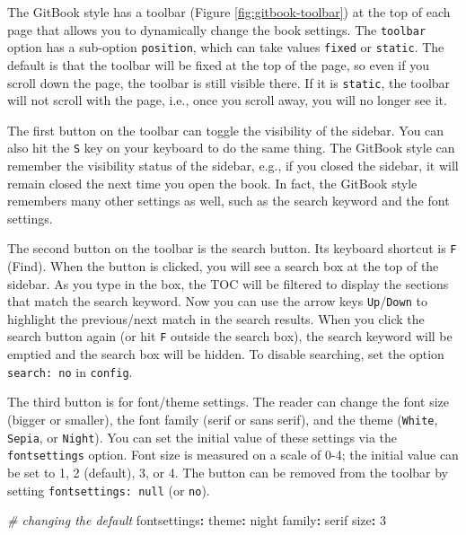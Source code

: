 \documentclass[
  12pt,
]{krantz}
\newenvironment{Shaded}{\begin{snugshade}}{\end{snugshade}}
\newcommand{\AttributeTok}[1]{\textcolor[rgb]{0.77,0.63,0.00}{#1}}
\newcommand{\CommentTok}[1]{\textcolor[rgb]{0.56,0.35,0.01}{\textit{#1}}}
\newcommand{\DecValTok}[1]{\textcolor[rgb]{0.00,0.00,0.81}{#1}}
\newcommand{\FunctionTok}[1]{\textcolor[rgb]{0.00,0.00,0.00}{#1}}
\newcommand{\KeywordTok}[1]{\textcolor[rgb]{0.13,0.29,0.53}{\textbf{#1}}}
\theoremstyle{definition}
\theoremstyle{definition}
\theoremstyle{definition}
\theoremstyle{definition}
\theoremstyle{remark}
\begin{document}
The GitBook style has a toolbar (Figure \ref{fig:gitbook-toolbar}) at the top of each page that allows you to dynamically change the book settings. The \texttt{toolbar} option has a sub-option \texttt{position}, which can take values \texttt{fixed} or \texttt{static}. The default is that the toolbar will be fixed at the top of the page, so even if you scroll down the page, the toolbar is still visible there. If it is \texttt{static}, the toolbar will not scroll with the page, i.e., once you scroll away, you will no longer see it.

The first button on the toolbar can toggle the visibility of the sidebar. You can also hit the \texttt{S} key on your keyboard to do the same thing. The GitBook style can remember the visibility status of the sidebar, e.g., if you closed the sidebar, it will remain closed the next time you open the book. In fact, the GitBook style remembers many other settings as well, such as the search keyword and the font settings.

The second button on the toolbar is the search button. Its keyboard shortcut is \texttt{F} (Find). When the button is clicked, you will see a search box at the top of the sidebar. As you type in the box, the TOC will be filtered to display the sections that match the search keyword. Now you can use the arrow keys \texttt{Up}/\texttt{Down} to highlight the previous/next match in the search results. When you click the search button again (or hit \texttt{F} outside the search box), the search keyword will be emptied and the search box will be hidden. To disable searching, set the option \texttt{search:\ no} in \texttt{config}.

The third button is for font/theme settings. The reader can change the font size (bigger or smaller), the font family (serif or sans serif), and the theme (\texttt{White}, \texttt{Sepia}, or \texttt{Night}). You can set the initial value of these settings via the \texttt{fontsettings} option. Font size is measured on a scale of 0-4; the initial value can be set to 1, 2 (default), 3, or 4. The button can be removed from the toolbar by setting \texttt{fontsettings:\ null} (or \texttt{no}).

\begin{Shaded}
\begin{Highlighting}[]
\CommentTok{\# changing the default}
\AttributeTok{    }\FunctionTok{fontsettings}\KeywordTok{:}
\AttributeTok{      }\FunctionTok{theme}\KeywordTok{:}\AttributeTok{ night}
\AttributeTok{      }\FunctionTok{family}\KeywordTok{:}\AttributeTok{ serif}
\AttributeTok{      }\FunctionTok{size}\KeywordTok{:}\AttributeTok{ }\DecValTok{3}
\end{Highlighting}
\end{Shaded}
\end{document}
